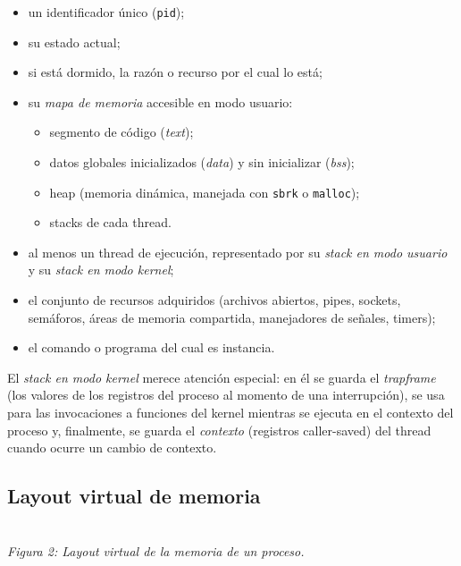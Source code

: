 \documentclass[11pt,a4paper]{article}
\begin{document}
\begin{itemize}[leftmargin=*]
    \item un identificador único (\texttt{pid});
    \item su estado actual;
    \item si está dormido, la razón o recurso por el cual lo está;
    \item su \emph{mapa de memoria} accesible en modo usuario:
    \begin{itemize}
        \item segmento de código (\emph{text});
        \item datos globales inicializados (\emph{data}) y sin
            inicializar (\emph{bss});
        \item heap (memoria dinámica, manejada con \texttt{sbrk} o
            \texttt{malloc});
        \item stacks de cada thread.
    \end{itemize}
    \item al menos un thread de ejecución, representado por su
        \emph{stack en modo usuario} y su \emph{stack en modo kernel};
    \item el conjunto de recursos adquiridos (archivos abiertos,
        pipes, sockets, semáforos, áreas de memoria compartida,
        manejadores de señales, timers);
    \item el comando o programa del cual es instancia.
\end{itemize}

El \emph{stack en modo kernel} merece atención especial: en él se
guarda el \emph{trapframe} (los valores de los registros del proceso
al momento de una interrupción), se usa para las invocaciones a
funciones del kernel mientras se ejecuta en el contexto del proceso
y, finalmente, se guarda el \emph{contexto} (registros caller-saved)
del thread cuando ocurre un cambio de contexto.

\subsection{Layout virtual de memoria}

\begin{center}
\\
\small\emph{Figura 2: Layout virtual de la memoria de un proceso.}
\end{center}
\end{document}
